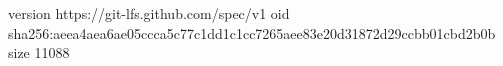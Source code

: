 version https://git-lfs.github.com/spec/v1
oid sha256:aeea4aea6ae05ccca5c77c1dd1c1cc7265aee83e20d31872d29ccbb01cbd2b0b
size 11088
